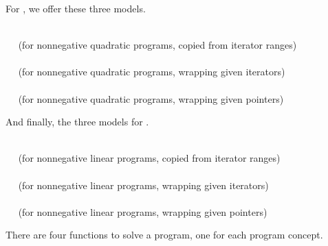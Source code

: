 For , we offer these
three models.

\\
$\quad$ (for nonnegative quadratic programs, copied from iterator ranges)\\
\\
$\quad$ (for nonnegative quadratic programs, wrapping given iterators)\\
\\
$\quad$ (for nonnegative quadratic programs, wrapping given pointers)

And finally, the three models for .

\\
$\quad$ (for nonnegative linear programs, copied from iterator ranges)\\
\\
$\quad$ (for nonnegative linear programs, wrapping given iterators)\\
\\
$\quad$ (for nonnegative linear programs, wrapping given pointers)\\

There are four functions to solve a program, one for each program
concept. 
